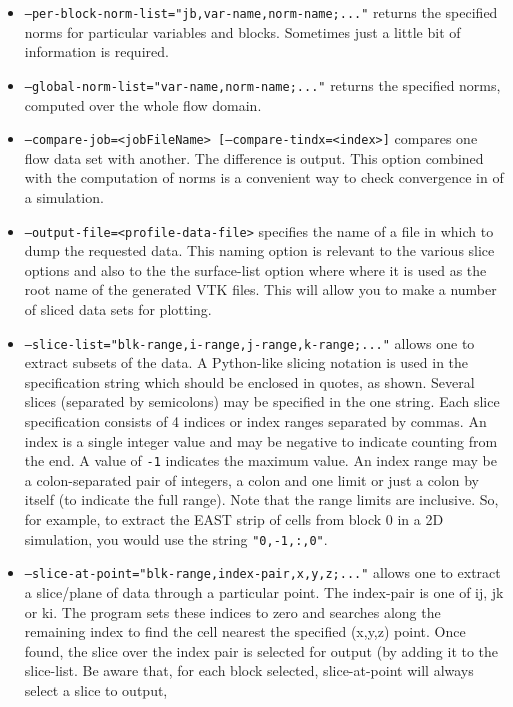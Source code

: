 \documentclass[12pt,a4paper,twoside]{article}
\begin{document}
\begin{itemize}
  \item \texttt{--per-block-norm-list="jb,var-name,norm-name;..."} returns the specified norms 
     for particular variables and blocks.  Sometimes just a little bit of information is required.
  \item \texttt{--global-norm-list="var-name,norm-name;..."} returns the specified norms,
     computed over the whole flow domain.
  \item \texttt{--compare-job=<jobFileName> [--compare-tindx=<index>]} compares one flow data set with another.
     The difference is output.  This option combined with the computation of norms is a convenient way to check
     convergence in of a simulation.
  \item \texttt{--output-file=<profile-data-file>} specifies the name of a file in which to dump the requested data.
     This naming option is relevant to the various slice options and also to the the surface-list option where
     where it is used as the root name of the generated VTK files.
     This will allow you to make a number of sliced data sets for plotting.
  \item \texttt{--slice-list="blk-range,i-range,j-range,k-range;..."} allows one to extract subsets of the data.
     A Python-like slicing notation is used in the specification string which should be enclosed in quotes, as shown. 
     Several slices (separated by semicolons) may be specified in the one string.
     Each slice specification consists of 4 indices or index ranges separated by commas.  
     An index is a single integer value and may be negative to indicate counting from the end.
     A value of \texttt{-1} indicates the maximum value.
     An index range may be a colon-separated pair of integers, a colon and one limit 
     or just a colon by itself (to indicate the full range).
     Note that the range limits are inclusive.
     So, for example, to extract the EAST strip of cells from block 0 in a 2D simulation, you would use
     the string \texttt{"0,-1,:,0"}.
  \item \texttt{--slice-at-point="blk-range,index-pair,x,y,z;..."} allows one to extract a slice/plane of data
     through a particular point.
     The index-pair is one of ij, jk or ki.  
     The program sets these indices to zero and searches along the remaining index to find the cell nearest 
     the specified (x,y,z) point.
     Once found, the slice over the index pair is selected for output (by adding it to the slice-list.
     Be aware that, for each block selected, slice-at-point will always select a slice to output, 

\end{itemize}
\end{document}
